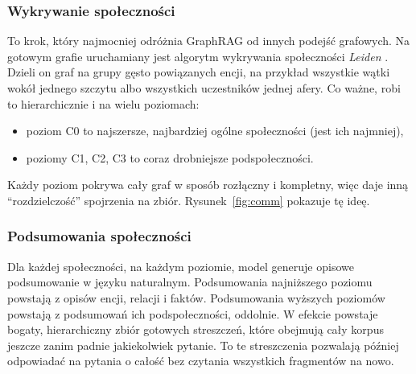 \documentclass[11pt,a4paper]{article}
\begin{document}
\subsubsection{Wykrywanie społeczności}

To krok, który najmocniej odróżnia GraphRAG od innych podejść grafowych. Na gotowym grafie
uruchamiany jest algorytm wykrywania społeczności \textit{Leiden} \cite{traag2019}. Dzieli on
graf na grupy gęsto powiązanych encji, na przykład wszystkie wątki wokół jednego szczytu albo
wszystkich uczestników jednej afery. Co ważne, robi to hierarchicznie i na wielu poziomach:

\begin{itemize}[itemsep=2pt]
  \item poziom C0 to najszersze, najbardziej ogólne społeczności (jest ich najmniej),
  \item poziomy C1, C2, C3 to coraz drobniejsze podspołeczności.
\end{itemize}

Każdy poziom pokrywa cały graf w sposób rozłączny i kompletny, więc daje inną
\enquote{rozdzielczość} spojrzenia na zbiór. Rysunek~\ref{fig:comm} pokazuje tę ideę.

\subsubsection{Podsumowania społeczności}

Dla każdej społeczności, na każdym poziomie, model generuje opisowe podsumowanie w języku
naturalnym. Podsumowania najniższego poziomu powstają z opisów encji, relacji i faktów.
Podsumowania wyższych poziomów powstają z podsumowań ich podspołeczności, oddolnie. W efekcie
powstaje bogaty, hierarchiczny zbiór gotowych streszczeń, które obejmują cały korpus jeszcze
zanim padnie jakiekolwiek pytanie. To te streszczenia pozwalają później odpowiadać na pytania
o całość bez czytania wszystkich fragmentów na nowo.
\end{document}
